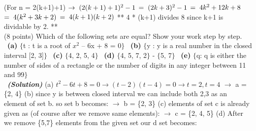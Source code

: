 \documentclass[a4 paper]{article}
\numberwithin{equation}{section}
\newcommand{\problem}[2]{~\\\fbox{\textbf{Problem #1}}\hfill (#2 points)\newline\newline}
\newcommand{\subproblem}[1]{~\newline\textbf{(#1)}}
\newcommand{\solution}{~\newline\textbf{\textit{(Solution)}} }
\newcommand{\0}{\mathbf{0}}
\begin{document}
(For n = 2(k+1)+1) $  \rightarrow \hspace{0.1cm} (2(k+1)+1)^2-1  $
                   $ =\hspace{0.1cm} (2k+3)^2-1        $
                   $ =\hspace{0.1cm} 4k^2 + 12k + 8    $
                   $ =\hspace{0.1cm} 4(k^2 + 3k + 2)   $
                   $ =\hspace{0.1cm} 4(k+1)(k+2)       $
\newline          
** 4 * (k+1) divides 8 since k+1 is dividable by 2. **                 
\newline               
\newline
\problem{6: Sets}{8}
Which of the following sets are equal? Show your work step by step.\newline
\subproblem{a} $\{$t : t is a root of $x^2$ – 6x + 8 = 0$\}$
\newline
\subproblem{b} $\{$y : y is a real number in the closed interval [2, 3]$\}$
\newline
\subproblem{c} $\{$4, 2, 5, 4$\}$
\newline
\subproblem{d} $\{$4, 5, 7, 2$\}$ - $\{$5, 7$\}$
\newline
\subproblem{e} $\{$q: q is either the number of sides of a rectangle or the number of digits in any integer between 11 and 99$\}$\\
\solution
\newline
\newline
(a) $ t^2 - 6t + 8 = 0 \rightarrow (t-2)(t-4) = 0 \rightarrow t = 2, t = 4 $
\newline
\newline
    $ \rightarrow $ a = \{2, 4\} 
\newline
\newline
(b) since y is between closed interval we can include both 2,3 as an element of set b. so set b becomes:
\newline
\newline
    $ \rightarrow $ b = \{2, 3\} 
\newline
\newline    
(c) elements of set c is already given as (of course after we remove same elements):
\newline
\newline
    $ \rightarrow $ c = \{2, 4, 5\}
\newline
\newline    
(d) After we remove \{5,7\} elements from the given set our d set becomes:
\end{document}
